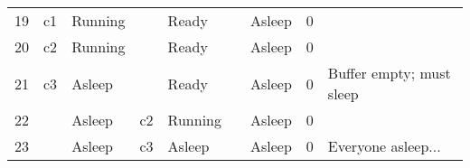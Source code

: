 \documentclass{article}
\begin{document}
\begin{table}[h!]
\begin{center}
\begin{tabular}{r|cl|cl|cl|c|l}
            19 & c1 & Running &    & Ready   &    & Asleep  & 0 &  \\
            20 & c2 & Running &    & Ready   &    & Asleep  & 0 &  \\
            21 & c3 & Asleep  &    & Ready   &    & Asleep  & 0 &  Buffer empty; must sleep \\  \hline
            22 &    & Asleep  & c2 & Running &    & Asleep  & 0 &  \\
            23 &    & Asleep  & c3 & Asleep  &    & Asleep  & 0 &  Everyone asleep... \\ \hline
        \end{tabular}
    \end{center}
\end{table}
\end{document}
